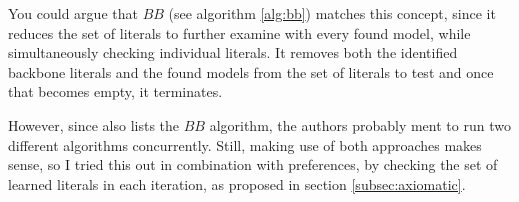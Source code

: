 You could argue that $BB$ (see algorithm \ref{alg:bb}) matches this concept, since it reduces the set of literals to further examine with every found model, while simultaneously checking individual literals. It removes both the identified backbone literals and the found models from the set of literals to test and once that becomes empty, it terminates.

However, since \cite{mjl10} also lists the $BB$ algorithm, the authors probably ment to run two different algorithms concurrently. Still, making use of both approaches makes sense, so I tried this out in combination with preferences, by checking the set of learned literals in each iteration, as proposed in section \ref{subsec:axiomatic}.